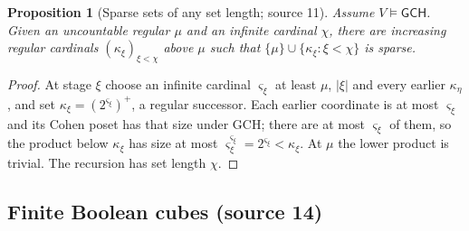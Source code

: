 \documentclass[11pt,letterpaper]{article}
\numberwithin{equation}{section}
\newtheorem{proposition}[proposition]{Proposition}
\theoremstyle{definition}
\theoremstyle{remark}
\newcommand{\abs}[1]{\lvert#1\rvert}
\newcommand{\GCH}{\mathsf{GCH}}
\begin{document}
\begin{proposition}[Sparse sets of any set length; source 11]\label{univ:gs:prop:sparse}
Assume $V\models\GCH$. Given an uncountable regular $\mu$ and an infinite cardinal
$\chi$, there are increasing regular cardinals $(\kappa_\xi)_{\xi<\chi}$ above $\mu$ such
that $\{\mu\}\cup\{\kappa_\xi:\xi<\chi\}$ is sparse.
\end{proposition}
\begin{proof}
At stage $\xi$ choose an infinite cardinal $\varsigma_\xi$ at least $\mu$, $\abs\xi$ and
every earlier $\kappa_\eta$, and set $\kappa_\xi=(2^{\varsigma_\xi})^+$, a regular
successor. Each earlier coordinate is at most $\varsigma_\xi$ and its Cohen poset has
that size under GCH; there are at most $\varsigma_\xi$ of them, so the product below
$\kappa_\xi$ has size at most $\varsigma_\xi^{\varsigma_\xi}=2^{\varsigma_\xi}<\kappa_\xi$.
At $\mu$ the lower product is trivial. The recursion has set length $\chi$.
\end{proof}

\subsection{Finite Boolean cubes (source 14)}
\end{document}
